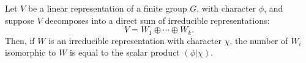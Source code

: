 Let $V$ be a linear representation of a finite group $G$, with character $\phi$, and suppose $V$ decomposes into a direct sum of irreducible representations:
$$V = W_1 \oplus \cdots \oplus W_k.$$
Then, if $W$ is an irreducible representation with character $\chi$, the number of $W_i$ isomorphic to $W$ is equal to the scalar product $(\phi|\chi)$.